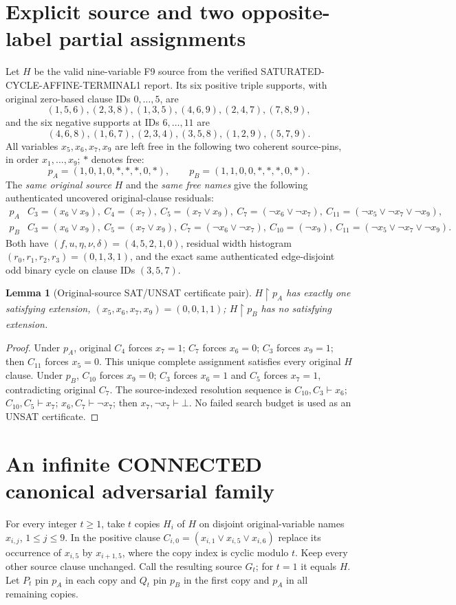 \documentclass[11pt]{article}
\newtheorem{lemma}{Lemma}
\begin{document}
\section{Explicit source and two opposite-label partial assignments}
Let $H$ be the valid nine-variable F9 source from the verified SATURATED-CYCLE-AFFINE-TERMINAL1 report. Its six positive triple supports, with original zero-based clause IDs $0,\ldots,5$, are
\[
(1,5,6),(2,3,8),(1,3,5),(4,6,9),(2,4,7),(7,8,9),
\]
and the six negative supports at IDs $6,\ldots,11$ are
\[
(4,6,8),(1,6,7),(2,3,4),(3,5,8),(1,2,9),(5,7,9).
\]
All variables $x_5,x_6,x_7,x_9$ are left free in the following two coherent source-pins, in order $x_1,\ldots,x_9$; $*$ denotes free:
\[
 p_A=(1,0,1,0,*,*,*,0,*),\qquad
 p_B=(1,1,0,0,*,*,*,0,*).
\]
The \emph{same original source} $H$ and the \emph{same free names} give the following authenticated uncovered original-clause residuals:
\[
\begin{array}{c|l}
p_A & C_3=(x_6\vee x_9),\ C_4=(x_7),\ C_5=(x_7\vee x_9),\ C_7=(\neg x_6\vee\neg x_7),\ C_{11}=(\neg x_5\vee\neg x_7\vee\neg x_9),\\
p_B & C_3=(x_6\vee x_9),\ C_5=(x_7\vee x_9),\ C_7=(\neg x_6\vee\neg x_7),\ C_{10}=(\neg x_9),\ C_{11}=(\neg x_5\vee\neg x_7\vee\neg x_9).
\end{array}
\]
Both have $(f,u,\eta,\nu,\delta)=(4,5,2,1,0)$, residual width histogram $(r_0,r_1,r_2,r_3)=(0,1,3,1)$, and the exact same authenticated edge-disjoint odd binary cycle on clause IDs $(3,5,7)$.

\begin{lemma}[Original-source SAT/UNSAT certificate pair]
$H\upharpoonright p_A$ has exactly one satisfying extension, $(x_5,x_6,x_7,x_9)=(0,0,1,1)$; $H\upharpoonright p_B$ has no satisfying extension.
\end{lemma}
\begin{proof}
Under $p_A$, original $C_4$ forces $x_7=1$; $C_7$ forces $x_6=0$; $C_3$ forces $x_9=1$; then $C_{11}$ forces $x_5=0$. This unique complete assignment satisfies every original $H$ clause. Under $p_B$, $C_{10}$ forces $x_9=0$; $C_3$ forces $x_6=1$ and $C_5$ forces $x_7=1$, contradicting original $C_7$. The source-indexed resolution sequence is $C_{10},C_3\vdash x_6$; $C_{10},C_5\vdash x_7$; $x_6,C_7\vdash\neg x_7$; then $x_7,\neg x_7\vdash\bot$. No failed search budget is used as an UNSAT certificate. \end{proof}

\section{An infinite CONNECTED canonical adversarial family}
For every integer $t\ge1$, take $t$ copies $H_i$ of $H$ on disjoint original-variable names $x_{i,j}$, $1\le j\le9$. In the positive clause $C_{i,0}=(x_{i,1}\vee x_{i,5}\vee x_{i,6})$ replace its occurrence of $x_{i,5}$ by $x_{i+1,5}$, where the copy index is cyclic modulo $t$. Keep every other source clause unchanged. Call the resulting source $G_t$; for $t=1$ it equals $H$. Let $P_t$ pin $p_A$ in each copy and $Q_t$ pin $p_B$ in the first copy and $p_A$ in all remaining copies.
\end{document}

